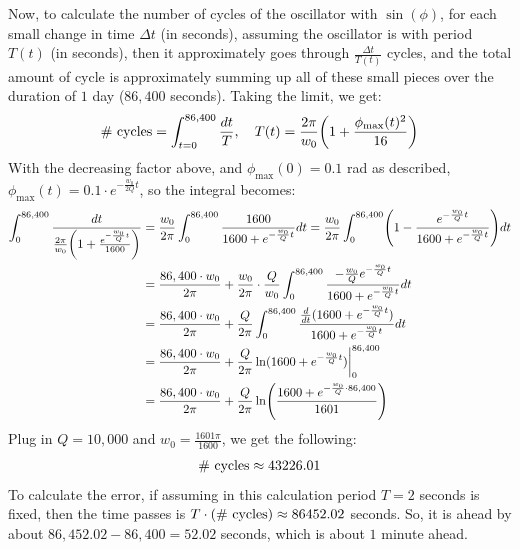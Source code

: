 \documentclass{article}
\DeclarePairedDelimiter{\paran}{(}{)}%
\begin{document}
Now, to calculate the number of cycles of the oscillator with $\sin(\phi)$, for each small change in time $\Delta t$ (in seconds), assuming the oscillator is with period $T(t)$ (in seconds), then it approximately goes through $\frac{\Delta t}{T(t)}$ cycles, and the total amount of cycle is approximately summing up all of these small pieces over the duration of $1$ day ($86,400$ seconds). Taking the limit, we get:
\begin{align}
    \#\textmd{ cycles} = \int_{t=0}^{86,400}\frac{dt}{T},\quad T(t) = \frac{2\pi}{w_0}\paran*{1+\frac{\phi_{\max}(t)^2}{16}}
\end{align}
With the decreasing factor above, and $\phi_{\max}(0)=0.1$ rad as described, $\phi_{\max}(t) = 0.1 \cdot e^{-\frac{w_0}{2Q}t}$, so the integral becomes:
\begin{align}
    \int_{0}^{86,400}\frac{dt}{\frac{2\pi}{w_0}\paran*{1+\frac{e^{-\frac{w_0}{Q}t}}{1600}}} &= \frac{w_0}{2\pi}\int_{0}^{86,400}\frac{1600}{1600+e^{-\frac{w_0}{Q}t}}dt = \frac{w_0}{2\pi}\int_{0}^{86,400}\paran*{1-\frac{e^{-\frac{w_0}{Q}t}}{1600+e^{-\frac{w_0}{Q}t}}}dt\\
    &= \frac{86,400\cdot w_0}{2\pi}+\frac{w_0}{2\pi}\cdot \frac{Q}{w_0}\int_{0}^{86,400}\frac{-\frac{w_0}{Q}e^{-\frac{w_0}{Q}t}}{1600+e^{-\frac{w_0}{Q}t}}dt\\
    &= \frac{86,400\cdot w_0}{2\pi}+\frac{Q}{2\pi}\int_{0}^{86,400}\frac{\frac{d}{dt}(1600+e^{-\frac{w_0}{Q}t})}{1600+e^{-\frac{w_0}{Q}t}}dt\\
    &= \frac{86,400\cdot w_0}{2\pi} + \frac{Q}{2\pi}\ln(1600+e^{-\frac{w_0}{Q}t})\bigg|_{0}^{86,400}\\
    &= \frac{86,400\cdot w_0}{2\pi} + \frac{Q}{2\pi}\ln\paran*{\frac{1600+e^{-\frac{w_0}{Q}\cdot 86,400}}{1601}}
\end{align}
Plug in $Q=10,000$ and $w_0=\frac{1601\pi}{1600}$, we get the following:
\begin{align}
    \textmd{\# cycles} \approx 43226.01
\end{align}
To calculate the error, if assuming in this calculation period $T=2$ seconds is fixed, then the time passes is $T\cdot (\textmd{\# cycles}) \approx 86452.02$ seconds. So, it is ahead by about $86,452.02-86,400 = 52.02$ seconds, which is about $1$ minute ahead.

\break
\end{document}
